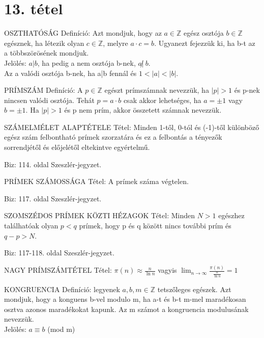 \section{13. tétel}

\begin{shaded}
OSZTHATÓSÁG Definíció: Azt mondjuk, hogy az $a \in \mathbb{Z}$ egész osztója $b \in \mathbb{Z}$ egésznek, ha létezik olyan $c \in \mathbb{Z}$, melyre $a \cdot c = b$. Ugyanezt fejezzük ki, ha b-t az a többszörösének mondjuk. \\
Jelölés: $a|b$, ha pedig a nem osztója b-nek, $a\!\not|\ b$.\\Az a valódi osztója b-nek, ha a|b fennál és $1 < |a| < |b|$.
\end{shaded}
\begin{shaded}
PRÍMSZÁM Definíció: A $p \in \mathbb{Z}$ egészt prímszámnak nevezzük, ha $|p| > 1$ és p-nek nincsen valódi osztója. Tehát $p = a \cdot b$ csak akkor lehetséges, ha $a = \pm 1$ vagy $b = \pm 1$. Ha $|p| > 1$ és p nem prím, akkor összetett számnak nevezzük.
\end{shaded}
\begin{framed}
SZÁMELMÉLET ALAPTÉTELE Tétel: Minden 1-től, 0-tól és (-1)-től különböző egész szám felbontható prímek szorzatára és ez a felbontás a tényezők sorrendjétől és előjelétől eltekintve egyértelmű.
\end{framed}
\begin{leftbar}
Biz: 114. oldal Szeszlér-jegyzet.
\end{leftbar}
\begin{framed}
PRÍMEK SZÁMOSSÁGA Tétel: A prímek száma végtelen.
\end{framed}
\begin{leftbar}
Biz: 117. oldal Szeszlér-jegyzet.
\end{leftbar}
\begin{framed}
SZOMSZÉDOS PRÍMEK KÖZTI HÉZAGOK Tétel: Minden $N > 1$ egészhez találhatóak olyan $p < q$ prímek, hogy p és q között nincs további prím és $q-p>N$.
\end{framed}
\begin{leftbar}
Biz: 117-118. oldal Szeszlér-jegyzet.
\end{leftbar}
\begin{framed}
NAGY PRÍMSZÁMTÉTEL Tétel: $\pi(n) \approx \frac{n}{\ln{n}}$ vagyis $\lim_{n\to\infty} \frac{\pi(n)}{\frac{n}{\ln{n}}} = 1$
\end{framed}
\begin{shaded}
KONGRUENCIA Definíció: legyenek $a,b,m\in\mathbb{Z}$ tetszőleges egészek. Azt mondjuk, hogy a konguens b-vel modulo m, ha a-t és b-t m-mel maradékosan osztva azonos maradékokat kapunk. Az m számot a kongruencia modulusának nevezzük. \\
Jelölés: $a \equiv b$ (mod m)

\end{shaded}
